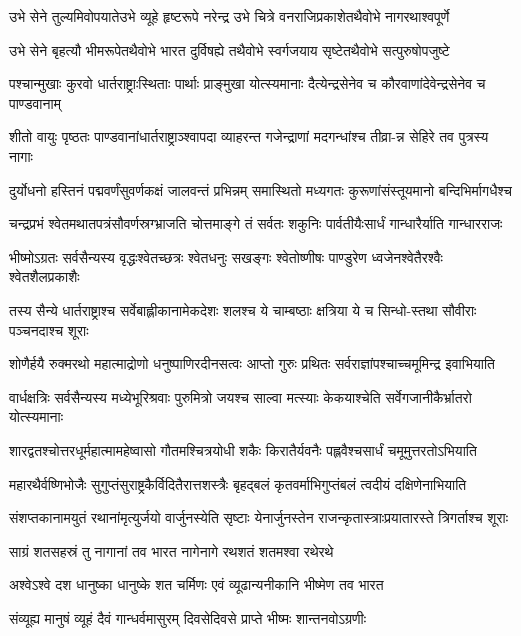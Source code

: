 \twolineshloka
{उभे सेने तुल्यमिवोपयातेउभे व्यूहे हृष्टरूपे नरेन्द्र}
{उभे चित्रे वनराजिप्रकाशेतथैवोभे नागरथाश्वपूर्णे}


\twolineshloka
{उभे सेने बृहत्यौ भीमरूपेतथैवोभे भारत दुर्विषह्ये}
{तथैवोभे स्वर्गजयाय सृष्टेतथैवोभे सत्पुरुषोपजुष्टे}


\twolineshloka
{पश्चान्मुखाः कुरवो धार्तराष्ट्राःस्थिताः पार्थाः प्राङ्मुखा योत्स्यमानाः}
{दैत्येन्द्रसेनेव च कौरवाणांदेवेन्द्रसेनेव च पाण्डवानाम्}


\twolineshloka
{शीतो वायुः पृष्ठतः पाण्डवानांधार्तराष्ट्राञ्श्वापदा व्याहरन्त}
{गजेन्द्राणां मदगन्धांश्च तीव्रा-न्न सेहिरे तव पुत्रस्य नागाः}


\twolineshloka
{दुर्योधनो हस्तिनं पद्मवर्णंसुवर्णकक्षं जालवन्तं प्रभिन्नम्}
{समास्थितो मध्यगतः कुरूणांसंस्तूयमानो बन्दिभिर्मागधैश्च}


\twolineshloka
{चन्द्रप्रभं श्वेतमथातपत्रंसौवर्णस्रग्भ्राजति चोत्तमाङ्गे}
{तं सर्वतः शकुनिः पार्वतीयैःसार्धं गान्धारैर्याति गान्धारराजः}


\twolineshloka
{भीष्मोऽग्रतः सर्वसैन्यस्य वृद्धःश्वेतच्छत्रः श्वेतधनुः सखङ्गः}
{श्वेतोष्णीषः पाण्डुरेण ध्वजेनश्वेतैरश्वैः श्वेतशैलप्रकाशैः}


\twolineshloka
{तस्य सैन्ये धार्तराष्ट्राश्च सर्वेबाह्लीकानामेकदेशः शलश्च}
{ये चाम्बष्ठाः क्षत्रिया ये च सिन्धो-स्तथा सौवीराः पञ्चनदाश्च शूराः}


\twolineshloka
{शोणैर्हयै रुक्मरथो महात्माद्रोणो धनुष्पाणिरदीनसत्वः}
{आप्तो गुरुः प्रथितः सर्वराज्ञांपश्चाच्चमूमिन्द्र इवाभियाति}


\twolineshloka
{वार्धक्षत्रिः सर्वसैन्यस्य मध्येभूरिश्रवाः पुरुमित्रो जयश्च}
{साल्वा मत्स्याः केकयाश्चेति सर्वेगजानीकैर्भ्रातरो योत्स्यमानाः}


\twolineshloka
{शारद्वतश्चोत्तरधूर्महात्मामहेष्वासो गौतमश्चित्रयोधी}
{शकैः किरातैर्यवनैः पह्लवैश्चसार्धं चमूमुत्तरतोऽभियाति}


\twolineshloka
{महारथैर्वष्णिभोजैः सुगुप्तंसुराष्ट्रकैर्विदितैरात्तशस्त्रैः}
{बृहद्बलं कृतवर्माभिगुप्तंबलं त्वदीयं दक्षिणेनाभियाति}


\twolineshloka
{संशप्तकानामयुतं रथानांमृत्युर्जयो वार्जुनस्येति सृष्टाः}
{येनार्जुनस्तेन राजन्कृतास्त्राःप्रयातारस्ते त्रिगर्ताश्च शूराः}


\twolineshloka
{साग्रं शतसहस्रं तु नागानां तव भारत}
{नागेनागे रथशतं शतमश्वा रथेरथे}


\twolineshloka
{अश्वेऽश्वे दश धानुष्का धानुष्के शत चर्मिणः}
{एवं व्यूढान्यनीकानि भीष्मेण तव भारत}


\twolineshloka
{संव्यूह्य मानुषं व्यूहं दैवं गान्धर्वमासुरम्}
{दिवसेदिवसे प्राप्ते भीष्मः शान्तनवोऽग्रणीः}


